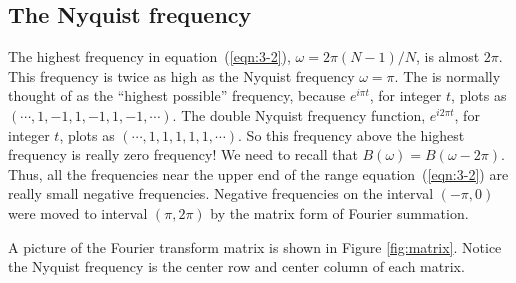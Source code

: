 \subsection{The Nyquist frequency}
The highest frequency
in equation~(\ref{eqn:3-2}),
$\omega=2\pi (N-1)/N$,
is almost $2\pi$.
This frequency is twice as high as the Nyquist frequency $\omega=\pi$.
The 
is normally thought of as the ``highest possible'' frequency,
because $e^{i\pi t}$, for integer $t$,
plots as $(\cdots ,1,-1,1,-1,1,-1,\cdots)$.
The double Nyquist frequency function,
$e^{i2\pi t}$, for integer $t$,
plots as $(\cdots ,1,1,1,1,1,\cdots)$.
So this frequency above the highest frequency is really zero frequency!
We need to recall that $B(\omega)=B(\omega -2\pi )$.
Thus, all the frequencies near the upper end of the range equation~(\ref{eqn:3-2})
are really small negative frequencies.
Negative frequencies on the interval $(-\pi,0)$
were moved to interval $(\pi,2\pi)$
by the matrix form of Fourier summation.

\par
A picture of the Fourier transform matrix is shown in Figure \ref{fig:matrix}.
Notice the Nyquist frequency is the center row
and center column of each matrix.


